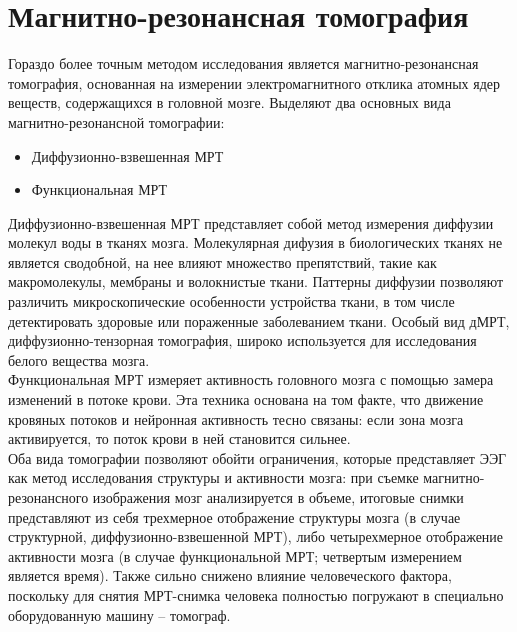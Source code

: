 \section{Магнитно-резонансная томография}
Гораздо более точным методом исследования является магнитно-резонансная томография, основанная на измерении электромагнитного отклика атомных ядер веществ, содержащихся в головной мозге. Выделяют два основных вида магнитно-резонансной томографии:
\begin{itemize}
    \item Диффузионно-взвешенная МРТ
    \item Функциональная МРТ
\end{itemize}
\indent Диффузионно-взвешенная МРТ представляет собой метод измерения диффузии молекул воды в тканях мозга. Молекулярная дифузия в биологических тканях не является сводобной, на нее влияют множество препятствий, такие как макромолекулы, мембраны и волокнистые ткани. Паттерны диффузии позволяют различить микроскопические особенности устройства ткани, в том числе детектировать здоровые или пораженные заболеванием ткани. Особый вид дМРТ, диффузионно-тензорная томография, широко используется для исследования белого вещества мозга.\\
\indent Функциональная МРТ измеряет активность головного мозга с помощью замера изменений в потоке крови. Эта техника основана на том факте, что движение кровяных потоков и нейронная активность тесно связаны: если зона мозга активируется, то поток крови в ней становится сильнее. \\
\indent Оба вида томографии позволяют обойти ограничения, которые представляет ЭЭГ как метод исследования структуры и активности мозга: при съемке магнитно-резонансного изображения мозг анализируется в объеме, итоговые снимки представляют из себя трехмерное отображение структуры мозга (в случае структурной, диффузионно-взвешенной МРТ), либо четырехмерное отображение активности мозга (в случае функциональной МРТ; четвертым измерением является время). Также сильно снижено влияние человеческого фактора, поскольку для снятия МРТ-снимка человека полностью погружают в специально оборудованную машину – томограф.
